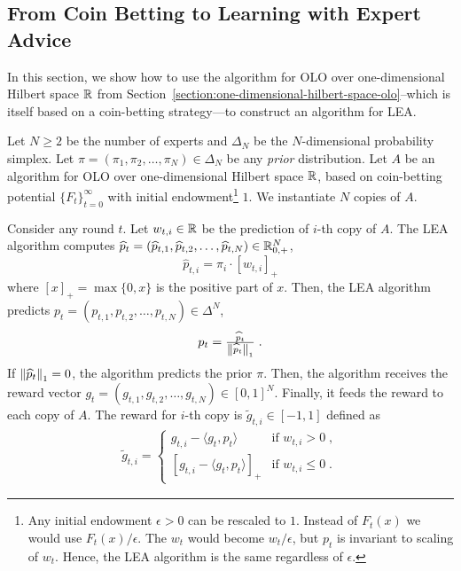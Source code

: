 \subsection{From Coin Betting to Learning with Expert Advice}
\label{section:reduction-experts}

In this section, we show how to use the algorithm for OLO over one-dimensional
Hilbert space $\mathbb{R}$ from
Section~\ref{section:one-dimensional-hilbert-space-olo}--which is itself based
on a coin-betting strategy---to construct an algorithm for \ac{LEA}.

Let $N \ge 2$ be the number of experts and $\Delta_N$ be the $N$-dimensional
probability simplex. Let $\pi = (\pi_1, \pi_2, \dots, \pi_N) \in \Delta_N$ be
any \emph{prior} distribution. Let $A$ be an algorithm for OLO over
one-dimensional Hilbert space $\mathbb{R}$, based on coin-betting potential 
$\{F_t\}_{t=0}^\infty$ with initial endowment\footnote{Any initial endowment $\epsilon > 0$ can be
rescaled to $1$. Instead of $F_t(x)$ we would use $F_t(x)/\epsilon$. The
$w_t$ would become $w_t/\epsilon$, but $p_t$
is invariant to scaling of $w_t$. Hence, the LEA algorithm is
the same regardless of $\epsilon$.} $1$. We instantiate $N$ copies of $A$.

Consider any round $t$. Let $w_{t,i} \in \mathbb{R}$ be the prediction of $i$-th copy of
$A$. The LEA algorithm computes $\widehat p_t = (\widehat p_{t,1}, \widehat
p_{t,2}, \dots, \widehat p_{t,N}) \in \mathbb{R}_{0,+}^N$,
\begin{equation}
\label{eq:phat}
\widehat p_{t,i} = \pi_i \cdot [w_{t,i}]_+
\end{equation}
where $[x]_+ = \max\{0,x\}$ is the positive part of $x$. Then, the LEA
algorithm predicts $p_t = (p_{t,1}, p_{t,2}, \dots, p_{t,N}) \in \Delta^N$,
\begin{equation}
\label{eq:preds_experts}
p_t = \tfrac{\widehat p_t}{\left\|{\widehat p_t}\right\|_1} \; .
\end{equation}
If $\left\|{\widehat p_t}\right\|_1 = 0$, the algorithm predicts the prior $\pi$.
Then, the algorithm receives the reward vector
$g_t = (g_{t,1}, g_{t,2}, \dots, g_{t,N}) \in [0,1]^N$. Finally, it
feeds the reward to each copy of $A$. The reward for $i$-th copy is $\widetilde g_{t,i} \in
[-1,1]$ defined as
\begin{align}
\label{eq:gradients_experts_reduction}
\widetilde g_{t,i} =
\begin{cases}
g_{t,i} - \langle g_t, p_t \rangle & \text{if } w_{t,i} > 0 \; , \\
\left[g_{t,i} - \langle g_t, p_t \rangle \right]_+ & \text{if } w_{t,i} \le 0 \; .
\end{cases}
\end{align}

